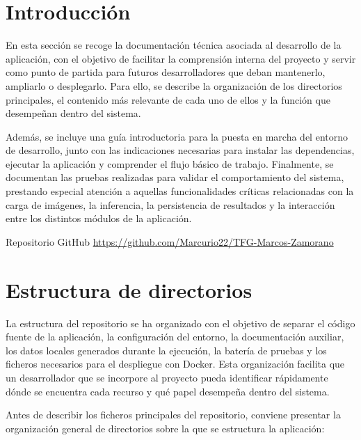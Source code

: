 
\section{Introducción}

En esta sección se recoge la documentación técnica asociada al desarrollo de la aplicación, con el objetivo de facilitar la comprensión interna del proyecto y servir como punto de partida para futuros desarrolladores que deban mantenerlo, ampliarlo o desplegarlo. Para ello, se describe la organización de los directorios principales, el contenido más relevante de cada uno de ellos y la función que desempeñan dentro del sistema. 

Además, se incluye una guía introductoria para la puesta en marcha del entorno de desarrollo, junto con las indicaciones necesarias para instalar las dependencias, ejecutar la aplicación y comprender el flujo básico de trabajo. Finalmente, se documentan las pruebas realizadas para validar el comportamiento del sistema, prestando especial atención a aquellas funcionalidades críticas relacionadas con la carga de imágenes, la inferencia, la persistencia de resultados y la interacción entre los distintos módulos de la aplicación.

\noindent
\begin{githubbox}{Repositorio GitHub}
	{\ttfamily\large\url{https://github.com/Marcurio22/TFG-Marcos-Zamorano}}
\end{githubbox}

\section{Estructura de directorios}

La estructura del repositorio se ha organizado con el objetivo de separar el código fuente de la aplicación, la configuración del entorno, la documentación auxiliar, los datos locales generados durante la ejecución, la batería de pruebas y los ficheros necesarios para el despliegue con Docker. Esta organización facilita que un desarrollador que se incorpore al proyecto pueda identificar rápidamente dónde se encuentra cada recurso y qué papel desempeña dentro del sistema.

Antes de describir los ficheros principales del repositorio, conviene presentar la organización general de directorios sobre la que se estructura la aplicación:

\begingroup
\setlength{\intextsep}{6pt}
\setlength{\textfloatsep}{6pt}
\setlength{\floatsep}{6pt}
\setlength{\abovecaptionskip}{3pt}
\setlength{\belowcaptionskip}{0pt}

